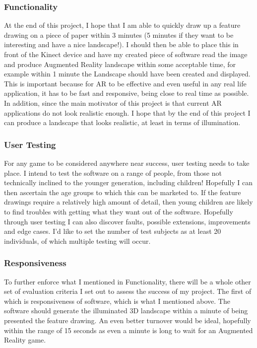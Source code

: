 \documentclass[11pt]{report}
\begin{document}
\subsubsection*{Functionality}
At the end of this project, I hope that I am able to quickly draw
up a feature drawing on a piece of paper within 3 minutes (5 minutes if they
want to be interesting and have a nice landscape!). I should then be able to 
place this in front of the Kinect device and have my created piece of 
software read the image and produce Augmented Reality landscape within some
acceptable time, for example within 1 minute the Landscape should have been
created and displayed. This is important because for AR to be effective and
even useful in any real life application, it has to be fast and responsive,
being close to real time as possible. In addition, since the main motivator
of this project is that current AR applications do not look realistic enough.
I hope that by the end of this project I can produce a landscape that looks
realistic, at least in terms of illumination.

\subsubsection*{User Testing}
For any game to be considered anywhere near success, user testing needs to 
take place. I intend to test the software on a range of people, from those not
technically inclined to the younger generation, including children! Hopefully
I can then ascertain the age groups to which this can be marketed to. If the
feature drawings require a relatively high amount of detail, then young children
are likely to find troubles with getting what they want out of the software.
Hopefully through user testing I can also discover faults, possible extensions,
improvements and edge cases. I'd like to set the number of test subjects as at
least 20 individuals, of which multiple testing will occur.

\subsubsection*{Responsiveness}
To further enforce what I mentioned in Functionality, there will be a whole 
other set of evaluation criteria I set out to assess the success of my project.
The first of which is responsiveness of software, which is what I mentioned 
above. The software should generate the illuminated 3D landscape within a 
minute of being presented the feature drawing. An even better turnover would
be ideal, hopefully within the range of 15 seconds as even a minute is long to
wait for an Augmented Reality game.
\end{document}

